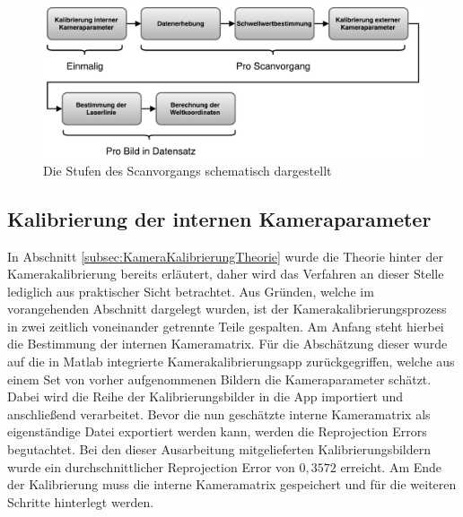 \begin{figure}
\includegraphics[width=\textwidth]{images/ScannerVerfahrenHori.pdf}
\caption{Die Stufen des Scanvorgangs schematisch dargestellt}\label{fig:scanVorgang}
\end{figure}

\subsection{Kalibrierung der internen Kameraparameter}
\label{subsec:interneKalibrierung}
In Abschnitt \ref{subsec:KameraKalibrierungTheorie} wurde die Theorie hinter der Kamerakalibrierung bereits erläutert, daher wird das Verfahren an dieser Stelle lediglich aus praktischer Sicht betrachtet. Aus Gründen, welche im vorangehenden Abschnitt dargelegt wurden, ist der Kamerakalibrierungsprozess in zwei zeitlich voneinander getrennte Teile gespalten. Am Anfang steht hierbei die Bestimmung der internen Kameramatrix. Für die Abschätzung dieser wurde auf die in Matlab integrierte Kamerakalibrierungsapp zurückgegriffen, welche aus einem Set von vorher aufgenommenen Bildern die Kameraparameter schätzt. Dabei wird die Reihe der Kalibrierungsbilder in die App importiert und anschließend verarbeitet. Bevor die nun geschätzte interne Kameramatrix als eigenständige Datei exportiert werden kann, werden die Reprojection Errors begutachtet. Bei den dieser Ausarbeitung mitgelieferten Kalibrierungsbildern wurde ein durchschnittlicher Reprojection Error von  \(0,3572\) erreicht. Am Ende der Kalibrierung muss die interne Kameramatrix gespeichert und für die weiteren Schritte hinterlegt werden.  

